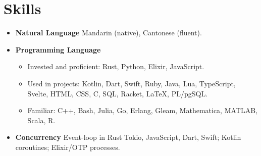 \documentclass[letterpaper,11pt]{article}
\let\origLaTeX\LaTeX
\renewcommand{\LaTeX}{{\fontfamily{lmr}\selectfont\origLaTeX}}
\begin{document}
\section{Skills}
\begin{itemize}[leftmargin=0.5cm, label={}]
    \item \textbf{Natural Language}\quad
    Mandarin (native), Cantonese (fluent).
    \item \textbf{Programming Language}
    \begin{itemize}\small
        \item Invested and proficient: Rust, Python, Elixir, JavaScript.
        \item Used in projects:
        Kotlin, Dart, Swift, Ruby, Java, Lua, TypeScript,
        Svelte, HTML, CSS, C, SQL, Racket, \LaTeX{}, PL/pgSQL.
        \item Familiar: C++, Bash, Julia, Go, Erlang, Gleam, Mathematica,
        MATLAB, Scala, R.
    \end{itemize}
    \item \textbf{Concurrency}\quad
    Event-loop in Rust Tokio, JavaScript, Dart, Swift; Kotlin coroutines;
    Elixir/OTP processes.
\end{itemize}
\end{document}
